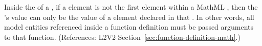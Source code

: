 Inside the  of a \FunctionDefinition, if a
 element is not the first element within a MathML
, then the 's value can only be the value
of a  element declared in that .  In
other words, all model entities referenced inside a function
definition must be passed arguments to that function.
(References: L2V2 Section~\ref{sec:function-definition-math}.)
